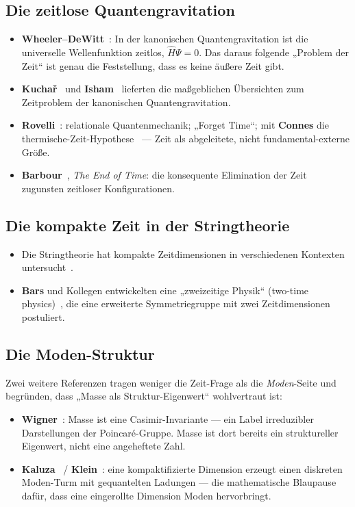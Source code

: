 \documentclass[11pt,a4paper]{article}
\begin{document}
\subsection{Die zeitlose Quantengravitation}
\begin{itemize}[leftmargin=1.4em,itemsep=0.25em]
  \item \textbf{Wheeler--DeWitt}~\cite{DeWitt1967,Wheeler1968}: In der kanonischen Quantengravitation ist die universelle Wellenfunktion zeitlos, $\hat{H}\Psi = 0$. Das daraus folgende „Problem der Zeit`` ist genau die Feststellung, dass es keine äußere Zeit gibt.
  \item \textbf{Kuchař}~\cite{Kuchar1992} und \textbf{Isham}~\cite{Isham1993} lieferten die maßgeblichen Übersichten zum Zeitproblem der kanonischen Quantengravitation.
  \item \textbf{Rovelli}~\cite{Rovelli1996,Rovelli2009}: relationale Quantenmechanik; „Forget Time``; mit \textbf{Connes} die thermische-Zeit-Hypothese~\cite{ConnesRovelli1994} --- Zeit als abgeleitete, nicht fundamental-externe Größe.
  \item \textbf{Barbour}~\cite{Barbour1999}, \emph{The End of Time}: die konsequente Elimination der Zeit zugunsten zeitloser Konfigurationen.
\end{itemize}

\subsection{Die kompakte Zeit in der Stringtheorie}
\begin{itemize}[leftmargin=1.4em,itemsep=0.25em]
  \item Die Stringtheorie hat kompakte Zeitdimensionen in verschiedenen Kontexten untersucht~\cite{GreenSchwarzWitten1987,Polchinski1998}.
  \item \textbf{Bars} und Kollegen entwickelten eine „zweizeitige Physik`` (two-time physics)~\cite{Bars1997,Bars2012}, die eine erweiterte Symmetriegruppe mit zwei Zeitdimensionen postuliert.
\end{itemize}

\subsection{Die Moden-Struktur}
Zwei weitere Referenzen tragen weniger die Zeit-Frage als die \emph{Moden}-Seite und begründen, dass „Masse als Struktur-Eigenwert`` wohlvertraut ist:
\begin{itemize}[leftmargin=1.4em,itemsep=0.25em]
  \item \textbf{Wigner}~\cite{Wigner1939}: Masse ist eine Casimir-Invariante --- ein Label irreduzibler Darstellungen der Poincaré-Gruppe. Masse ist dort bereits ein struktureller Eigenwert, nicht eine angeheftete Zahl.
  \item \textbf{Kaluza}~\cite{Kaluza1921} / \textbf{Klein}~\cite{Klein1926}: eine kompaktifizierte Dimension erzeugt einen diskreten Moden-Turm mit gequantelten Ladungen --- die mathematische Blaupause dafür, dass eine eingerollte Dimension Moden hervorbringt.
\end{itemize}
\end{document}
